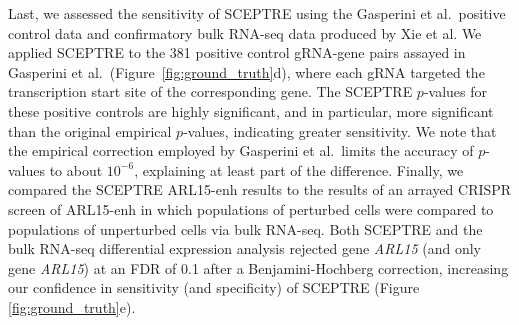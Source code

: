 \documentclass{nature}
\begin{document}
Last, we assessed the sensitivity of SCEPTRE using the Gasperini et al.\ positive control data and confirmatory bulk RNA-seq data produced by Xie et al. We applied SCEPTRE to the 381 positive control gRNA-gene pairs assayed in Gasperini et al.\ (Figure~\ref{fig:ground_truth}d), where each gRNA targeted the transcription start site of the corresponding gene. The SCEPTRE $p$-values for these positive controls are highly significant, and in particular, more significant than the original empirical $p$-values, indicating greater sensitivity. We note that the empirical correction employed by Gasperini et al.\ limits the accuracy of $p$-values to about $10^{-6}$, explaining at least part of the difference. Finally, we compared the SCEPTRE ARL15-enh results to the results of an arrayed CRISPR screen of ARL15-enh in which populations of perturbed cells were compared to populations of unperturbed cells via bulk RNA-seq.\cite{Xie2019} Both SCEPTRE and the bulk RNA-seq differential expression analysis rejected gene \textit{ARL15} (and only gene \textit{ARL15}) at an FDR of 0.1 after a Benjamini-Hochberg correction, increasing our confidence in sensitivity (and specificity) of SCEPTRE (Figure \ref{fig:ground_truth}e).
\end{document}
